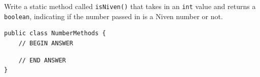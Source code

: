 \documentclass[11pt,answers]{exam}
\begin{document}
\begin{questions}
\par
Write a static method called {\tt isNiven()} that takes in an {\tt int} value and returns a {\tt boolean}, indicating if the number passed in is a Niven number or not.  

\begin{verbatim}
public class NumberMethods {
    // BEGIN ANSWER
\end{verbatim}

\begin{solution}[5in]
\end{solution}

\begin{verbatim}
    // END ANSWER
}	
\end{verbatim}

\end{questions}
\end{document}
